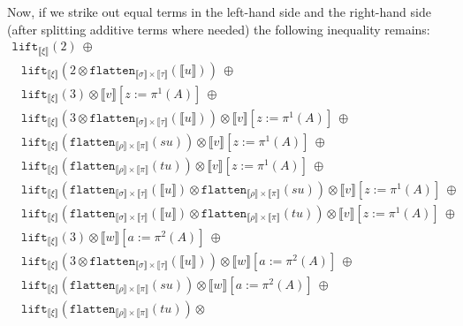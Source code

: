 \documentclass[runningheads,a4paper]{llncs}
\newcommand{\typeinterpret}[1]{\llbracket #1 \rrbracket}
\newcommand{\interpret}[1]{\llbracket #1 \rrbracket}
\newcommand{\flatten}{\mathtt{flatten}}
\newcommand{\lift}{\mathtt{lift}}
\begin{document}
\begin{itemize}
  Now, if we strike out equal terms in the left-hand side and the
  right-hand side (after splitting additive terms where needed)
  the following inequality remains:
  \[
  \begin{array}{l}
  \lift_{\typeinterpret{\xi}}(2)\ \oplus \\
  \phantom{A}
     \lift_{\typeinterpret{\xi}}(2 \otimes
      \flatten_{\typeinterpret{\sigma} \times \typeinterpret{\tau}}(
      \interpret{u}))\ \oplus \\
  \phantom{A}
    \lift_{\typeinterpret{\xi}}(3) \otimes \interpret{v}[z:=\pi^1(A)]
    \ \oplus \\
  \phantom{A}
    \lift_{\typeinterpret{\xi}}(3 \otimes
    \flatten_{\typeinterpret{\sigma} \times \typeinterpret{\tau}}(
    \interpret{u})) \otimes
     \interpret{v}[z:=\pi^1(A)]
    \ \oplus \\
  \phantom{A}
    \lift_{\typeinterpret{\xi}}(\flatten_{\typeinterpret{\rho} \times
    \typeinterpret{\pi}}(su)) \otimes
     \interpret{v}[z:=\pi^1(A)]
    \ \oplus\\
  \phantom{A}
    \lift_{\typeinterpret{\xi}}(\flatten_{\typeinterpret{\rho} \times
    \typeinterpret{\pi}}(tu)) \otimes
     \interpret{v}[z:=\pi^1(A)]
    \ \oplus \\
  \phantom{A}
    \lift_{\typeinterpret{\xi}}(\flatten_{\typeinterpret{\sigma} \times
    \typeinterpret{\tau}}(\interpret{u}) \otimes
    \flatten_{\typeinterpret{\rho} \times \typeinterpret{\pi}}(su))
    \otimes
     \interpret{v}[z:=\pi^1(A)]
    \ \oplus \\
  \phantom{A}
    \lift_{\typeinterpret{\xi}}(\flatten_{\typeinterpret{\sigma} \times
    \typeinterpret{\tau}}(\interpret{u}) \otimes
    \flatten_{\typeinterpret{\rho} \times \typeinterpret{\pi}}(tu))
    \otimes
     \interpret{v}[z:=\pi^1(A)]
    \ \oplus \\
  \phantom{A}
    \lift_{\typeinterpret{\xi}}(3) \otimes \interpret{w}[a:=\pi^2(A)]
    \ \oplus \\
  \phantom{A}
    \lift_{\typeinterpret{\xi}}(3 \otimes
    \flatten_{\typeinterpret{\sigma} \times \typeinterpret{\tau}}(
    \interpret{u})) \otimes
    \interpret{w}[a:=\pi^2(A)]
    \ \oplus \\
  \phantom{A}
    \lift_{\typeinterpret{\xi}}(\flatten_{\typeinterpret{\rho} \times
    \typeinterpret{\pi}}(su)) \otimes
    \interpret{w}[a:=\pi^2(A)]
    \ \oplus\\
  \phantom{A}
    \lift_{\typeinterpret{\xi}}(\flatten_{\typeinterpret{\rho} \times
    \typeinterpret{\pi}}(tu)) \otimes

\end{array}\]
\end{itemize}
\end{document}
